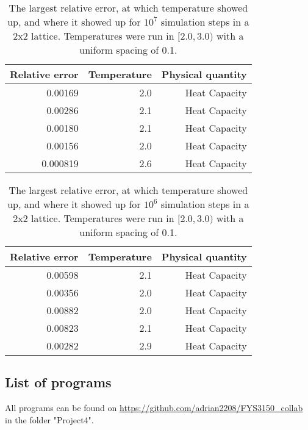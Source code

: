 \documentclass[10pt,a4paper]{article}
\begin{document}
\begin{table}[H]
\centering
\caption[2x2 lattice rel. errors with  $10^7$ simulation steps]{The largest relative error, at which temperature showed up, and where it showed up for $10^7$ simulation steps in a 2x2 lattice. Temperatures were run in $[2.0,3.0)$ with a uniform spacing of 0.1.}
\begin{tabular}{|r|r|r|}
\hline
Relative error & Temperature & Physical quantity \\ \hline
0.00169        & 2.0         & Heat Capacity     \\ \hline
0.00286        & 2.1         & Heat Capacity     \\ \hline
0.00180        & 2.1         & Heat Capacity     \\ \hline
0.00156        & 2.0         & Heat Capacity     \\ \hline
0.000819       & 2.6         & Heat Capacity     \\ \hline
\end{tabular}
\end{table}
\begin{table}[H]
\centering
\caption[2x2 lattice rel. errors with  $10^6$ simulation steps]{The largest relative error, at which temperature showed up, and where it showed up for $10^6$ simulation steps in a 2x2 lattice. Temperatures were run in $[2.0,3.0)$ with a uniform spacing of 0.1.}
\begin{tabular}{|r|r|r|}
\hline
Relative error & Temperature & Physical quantity \\ \hline
0.00598     & 2.1         & Heat Capacity     \\ \hline
0.00356        & 2.0        & Heat Capacity     \\ \hline
0.00882        & 2.0        & Heat Capacity     \\ \hline
0.00823        & 2.1        & Heat Capacity     \\ \hline
0.00282       & 2.9         & Heat Capacity     \\ \hline
\end{tabular}
\end{table}
\subsection{List of programs}
All programs can be found on \url{https://github.com/adrian2208/FYS3150_collab} in the folder "Project4".
\end{document}
